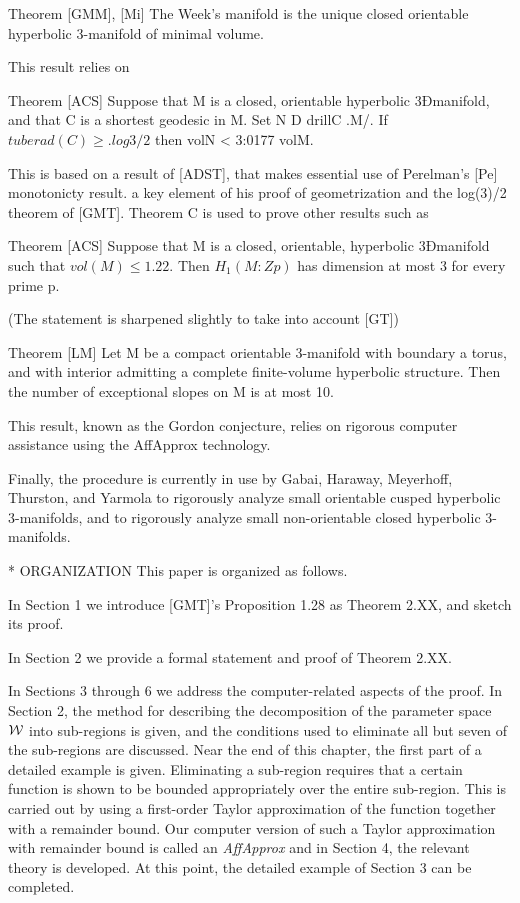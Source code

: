 Theorem [GMM], [Mi] The Week's manifold
is the unique closed orientable hyperbolic 3-manifold of minimal volume.

This result relies on 

Theorem  [ACS] Suppose that M is a closed, orientable hyperbolic 3Ðmanifold,
and that C is a shortest geodesic in M.
Set N D drillC .M/. If $tuberad(C) \ge .log 3/2$ then
volN < 3:0177 volM.

This is based on a result of [ADST],
that makes essential use of Perelman's [Pe] monotonicty result.
a key element of his proof of geometrization and the log(3)/2 theorem of [GMT].
Theorem C is used to prove other results such as 

Theorem [ACS] Suppose that M is a closed, orientable, hyperbolic
3Ðmanifold such that $vol(M)\le 1.22$.
Then $H_1(M:Zp)$ has dimension at most 3 for every prime p.

(The statement is sharpened slightly to take into account [GT])

Theorem [LM] Let M be a compact orientable 3-manifold with boundary a torus,
and with interior admitting a complete finite-volume hyperbolic structure.
Then the number of exceptional slopes on M is at most 10.

This result, known as the Gordon conjecture,
relies on rigorous computer assistance using the AffApprox technology.

Finally, the procedure is currently in use
by Gabai, Haraway, Meyerhoff, Thurston, and Yarmola
to rigorously analyze small orientable cusped hyperbolic $3$-manifolds,
and to rigorously analyze small non-orientable closed hyperbolic $3$-manifolds.

* ORGANIZATION
This paper is organized as follows.  

In Section 1 we introduce [GMT]'s Proposition 1.28 as Theorem 2.XX, and sketch its proof.

In Section 2 we provide a formal statement and proof of Theorem 2.XX.

In Sections 3 through 6 we address the computer-related aspects of the 
proof.   In Section 2, the method for describing the decomposition of the 
parameter space ${\cal W}$ into sub-regions is given, and the conditions 
used to eliminate all but seven of the sub-regions are discussed.  Near the 
end of this chapter, the first part of a detailed example is given.  Eliminating 
a sub-region requires that a certain function is shown to be bounded 
appropriately over the entire sub-region.  This is carried out by using a 
first-order Taylor approximation of the function together with a 
remainder 
bound.  Our computer version of such a Taylor approximation with remainder bound 
is called an {\it AffApprox} and in Section 4, the relevant theory is 
developed.  At this point, the detailed example of Section 3 can be 
completed.

